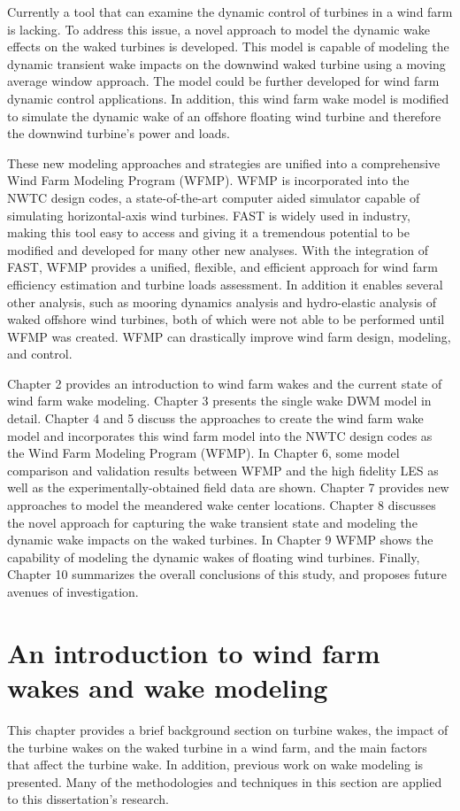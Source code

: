 \documentclass{umthesis}
\begin{document}
Currently a tool that can examine the dynamic control of turbines in a wind farm is lacking. To address this issue, a novel approach to model the dynamic wake effects on the waked turbines is developed. This model is capable of modeling the dynamic transient wake impacts on the downwind waked turbine using a moving average window approach. The model could be further developed for wind farm dynamic control applications. In addition, this wind farm wake model is modified to simulate the dynamic wake of an offshore floating wind turbine and therefore the downwind turbine's power and loads.

These new modeling approaches and strategies are unified into a comprehensive Wind Farm Modeling Program (WFMP). WFMP is incorporated into the NWTC design codes, a state-of-the-art computer aided simulator capable of simulating horizontal-axis wind turbines. FAST is widely used in industry, making this tool easy to access and giving it a tremendous potential to be modified and developed for many other new analyses. With the integration of FAST,  WFMP provides a unified, flexible, and efficient approach for wind farm efficiency estimation and turbine loads assessment. In addition it enables several other analysis, such as mooring dynamics analysis and hydro-elastic analysis of waked offshore wind turbines, both of which were not able to be performed until WFMP was created. WFMP can drastically improve wind farm design, modeling, and control.

Chapter 2 provides an introduction to wind farm wakes and the current state of wind farm wake modeling. Chapter 3 presents the single wake DWM model in detail. Chapter 4 and 5 discuss the approaches to create the wind farm wake model and incorporates this wind farm model into the NWTC design codes as the Wind Farm Modeling Program (WFMP). In Chapter 6, some model comparison and validation results between WFMP and the high fidelity LES as well as the experimentally-obtained field data are shown. Chapter 7 provides new approaches to model the meandered wake center locations. Chapter 8 discusses the novel approach for capturing the wake transient state and modeling the dynamic wake impacts on the waked turbines. In Chapter 9 WFMP shows the capability of modeling the dynamic wakes of floating wind turbines.  Finally, Chapter 10 summarizes the overall conclusions of this study, and proposes future avenues of investigation.


\chapter{An introduction to wind farm wakes and wake modeling}
This chapter provides a brief background section on turbine wakes, the impact of the turbine wakes on the waked turbine in a wind farm, and the main factors that affect the turbine wake. In addition, previous work on wake modeling is presented. Many of the methodologies and techniques in this section are applied to this dissertation's research.
\end{document}
